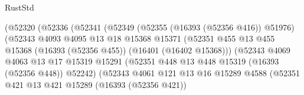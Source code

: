 \begin{lexlean}{RustStd}
\begin{coremodule}
                                      (@52320
                                        (@52336
                                          (@52341
                                            (@52349
                                              (@52355 (@16393 (@52356 @416)) @51976)
                                              (@52343
                                                @4093
                                                @4095
                                                @13
                                                @18
                                                @15368
                                                @15371
                                                (@52351
                                                  @455
                                                  @13
                                                  @455
                                                  @15368
                                                  (@16393 (@52356 @455))
                                                  (@16401 (@16402 @15368)))
                                                (@52343
                                                  @4069
                                                  @4063
                                                  @13
                                                  @17
                                                  @15319
                                                  @15291
                                                  (@52351
                                                    @448
                                                    @13
                                                    @448
                                                    @15319
                                                    (@16393 (@52356 @448))
                                                    @52242)
                                                  (@52343
                                                    @4061
                                                    @121
                                                    @13
                                                    @16
                                                    @15289
                                                    @4588
                                                    (@52351
                                                      @421
                                                      @13
                                                      @421
                                                      @15289
                                                      (@16393 (@52356 @421))

\end{coremodule}
\end{lexlean}

